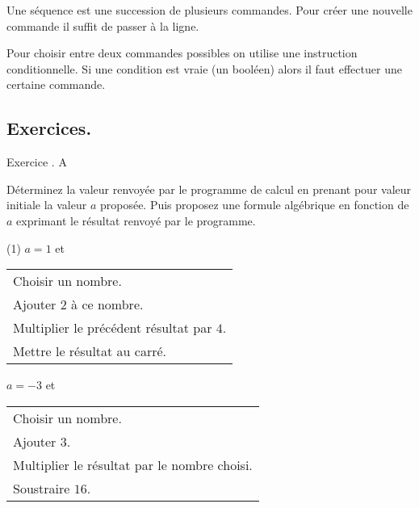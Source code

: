 \documentclass[a5paper]{article} %
\theoremstyle{plain}
\newenvironment{lecon}{\color{black}}{}
\newenvironment{colbox}[1]
{\newcommand\colboxcolor{#1}%
	\begin{lrbox}{\selvestebox}%
		\begin{minipage}{\dimexpr\columnwidth-2\fboxsep\relax}}
		{\end{minipage}\end{lrbox}%
	\begin{center}
		\colorbox{\colboxcolor}{\usebox{\selvestebox}}
\end{center}}
\newcounter{Exercice}
\newcounter{Exercicecorrection}
\newenvironment{exercice}[1]{ \setcounter{Exercicecorrection}{\theExercice} \color{black} \begin{colbox}{LimeGreen!30} \hfill \small {\color{OliveGreen}Exercice \theExercice. {\color{black}#1}} \hfill \addtocounter{Exercice}{1}}{ \end{colbox} }
\begin{document}
\begin{lecon}
	
	\medskip
	Une séquence est une succession de plusieurs commandes. Pour créer une nouvelle commande il suffit de passer à la ligne.
	
\end{lecon}

\begin{lecon}
	
	\medskip
	Pour choisir entre deux commandes possibles on utilise une instruction conditionnelle. Si une condition est vraie (un booléen) alors il faut effectuer une certaine commande. 
	
\end{lecon}

\subsection{Exercices.}

\begin{exercice}{A}
	
	Déterminez la valeur renvoyée par le programme de calcul en prenant pour valeur initiale la valeur $a$ proposée. Puis proposez une formule algébrique en fonction de $a$ exprimant le résultat renvoyé par le programme.
	
	\begin{tasks}(1)
		\task $a=1$ et 
		\begin{tabular}{|m{6cm}|}
			\hline
			Choisir un nombre.
			\\
			Ajouter $2$ à ce nombre.
			\\
			Multiplier le précédent résultat par $4$.
			\\
			Mettre le résultat au carré.
			\\
			\hline
		\end{tabular}
		\task $a=-3$ et 
		\begin{tabular}{|m{6cm}|}
			\hline
			Choisir un nombre.
			\\
			Ajouter $3$.
			\\
			Multiplier le résultat par le nombre choisi.
			\\
			Soustraire $16$.
			\\
			\hline
		\end{tabular}
	\end{tasks}
	
\end{exercice}
\end{document}
